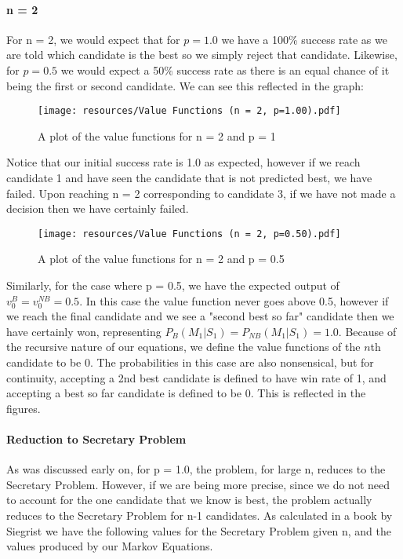 \documentclass[a4paper,11pt]{article}
\begin{document}
\paragraph{n = 2} 

For n = 2, we would expect that for $p=1.0$ we have a 100\% success rate as we are told which candidate is the best so we simply reject that candidate. Likewise, for $p=0.5$ we would expect a 50\% success rate as there is an equal chance of it being the first or second candidate. We can see this reflected in the graph:

\begin{figure}[H]
    \centering
    \texttt{[image: resources/Value Functions (n = 2, p=1.00).pdf]}
    \caption{A plot of the value functions for n = 2 and p = 1}
    \label{fig:n=2p=1}
\end{figure}

Notice that our initial success rate is 1.0 as expected, however if we reach candidate 1 and have seen the candidate that is not predicted best, we have failed. Upon reaching n = 2 corresponding to candidate 3, if we have not made a decision then we have certainly failed.

\begin{figure}[H]
    \centering
    \texttt{[image: resources/Value Functions (n = 2, p=0.50).pdf]}
    \caption{A plot of the value functions for n = 2 and p = 0.5}
    \label{fig:n=2p=0.5}
\end{figure}

Similarly, for the case where p = 0.5, we have the expected output of $v^B_0 = v^{NB}_0=0.5$. In this case the value function never goes above 0.5, however if we reach the final candidate and we see a "second best so far" candidate then we have certainly won, representing $P_B(M_1|S_1) = P_{NB}(M_1|S_1) = 1.0$. Because of the recursive nature of our equations, we define the value functions of the $n$th candidate to be 0. The probabilities in this case are also nonsensical, but for continuity, accepting a 2nd best candidate is defined to have win rate of 1, and accepting a best so far candidate is defined to be 0. This is reflected in the figures.

\paragraph{Reduction to Secretary Problem}

As was discussed early on, for p = 1.0, the problem, for large n, reduces to the Secretary Problem. However, if we are being more precise, since we do not need to account for the one candidate that we know is best, the problem actually reduces to the Secretary Problem for n-1 candidates. As calculated in a book by Siegrist \cite{Libretexts_2022} we have the following values for the Secretary Problem given n, and the values produced by our Markov Equations.
\end{document}
